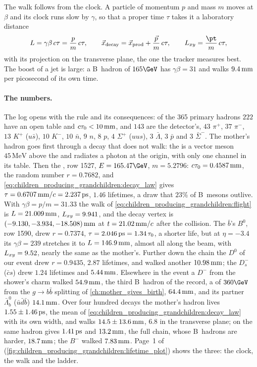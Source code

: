 The walk follows from the clock. A particle of momentum $p$ and mass $m$
moves at $\beta$ and its clock runs slow by $\gamma$, so that a proper
time $\tau$ takes it a laboratory distance
\begin{equation}
  L=\gamma\beta\,c\tau=\frac{p}{m}\,c\tau,\qquad
  \vec x_{\mathrm{decay}}=\vec x_{\mathrm{prod}}+\frac{\vec p}{m}\,c\tau,\qquad
  \Lxy=\frac{\pt}{m}\,c\tau,
  \label{eq:children_producing_grandchildren:flight}
\end{equation}
with \Lxy its projection on the transverse plane, the one the tracker
measures best. The boost of a jet is large: a B~hadron of $165\GeV$ has
$\gamma\beta=31$ and walks $9.4\,\mathrm{mm}$ per picosecond of its own time.

\paragraph{The numbers.} The  log opens with the rule and its
consequences: of the 365 primary hadrons $222$ have an open table and
$c\tau_0<10\,\mathrm{mm}$, and $143$ are the detector's, $43$ $\pi^+$, $37$ $\pi^-$,
$13$ $K^+$ ($u\bar s$), $10$ $K^-$, $10$ $\bar n$, $9$ $n$, $8$ $p$, $4$
$\Sigma^+$ ($uus$), $3$ $\bar\Lambda$, $3$ $\bar p$ and $3$ $\bar\Sigma^-$.
The mother's hadron goes first through a decay that does not walk: the
\Bstarbar is a vector meson $45\,\mathrm{MeV}$ above the \Bbar and
radiates a photon at the origin, with only one channel in its table. Then
the \Bbar, row 1527, $E=165.47\GeV$, $m=5.2796$: $c\tau_0=0.4587\,\mathrm{mm}$, the
random number $r=0.7682$, and \cref{eq:children_producing_grandchildren:decay_law}
gives $\tau=0.6707\,\mathrm{mm}/c=2.237\,\mathrm{ps}$, $1.46$ lifetimes, a draw that $23\%$ of
B~mesons outlive. With $\gamma\beta=p/m=31.33$ the walk of
\cref{eq:children_producing_grandchildren:flight} is $L=21.009\,\mathrm{mm}$,
$L_{xy}=9.941$, and the decay vertex is $(-9.130,-3.934,-18.508)\,\mathrm{mm}$ at
$t=21.02\,\mathrm{mm}/c$ after the collision. The $\bar b$'s $B^0$, row 1590, drew
$r=0.7374$, $\tau=2.046\,\mathrm{ps}=1.34\,\tau_0$, a shorter life, but at $\eta=-3.4$
its $\gamma\beta=239$ stretches it to $L=146.9\,\mathrm{mm}$, almost all along the
beam, with $L_{xy}=9.52$, nearly the same as the mother's. Further down the
chain the $D^0$ of our event drew $r=0.9435$, $2.87$ lifetimes, and walked
another $10.98\,\mathrm{mm}$; the $D_s^-$ ($\bar cs$) drew $1.24$ lifetimes and
$5.44\,\mathrm{mm}$. Elsewhere in the event a $D^-$ from the shower's charm walked
$54.9\,\mathrm{mm}$, the third B~hadron of the record, a \Bbar of $360\GeV$ from the
$g\to b\bar b$ splitting of \cref{ch:mother_gives_birth}, $64.4\,\mathrm{mm}$, and
its partner $\bar\Lambda_b^0$ ($\bar u\bar d\bar b$) $14.1\,\mathrm{mm}$. Over four
hundred decays the mother's hadron lives $1.55\pm1.46\,\mathrm{ps}$, the mean of
\cref{eq:children_producing_grandchildren:decay_law} with its own width,
and walks $14.5\pm13.6\,\mathrm{mm}$, $6.8$ in the transverse plane; \PYTHIA on the
same hadron gives $1.41\,\mathrm{ps}$ and $13.2\,\mathrm{mm}$, the full chain, whose B~hadrons
are harder, $18.7\,\mathrm{mm}$; the \CMSSW $B^-$ walked $7.83\,\mathrm{mm}$. Page~1 of
(\cref{fig:children_producing_grandchildren:lifetime_plot}) shows the
three: the clock, the walk and the ladder.


